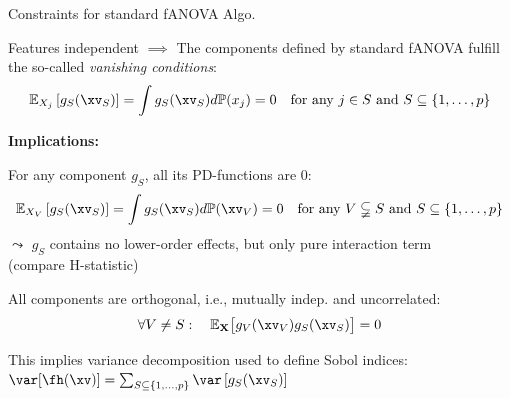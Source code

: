 \documentclass[10pt,compress,t,notes=noshow, xcolor=table]{beamer}
\newcommand{\Xv}{\mathbf{X}} %
\begin{document}
\begin{framev}[align=top]{Constraints for standard fANOVA Algo.}
\begin{theorem}
Features independent $\implies$ The components defined by standard fANOVA fulfill the so-called \textit{vanishing conditions}:
\begin{align*}
\mathbb{E}_{X_j}\left[ g_{S}(\xv_S) \right]
= \int g_{S}(\xv_S) d \mathbb{P}(x_j) = 0 \quad \text{for any } j \in S \text{ and } S \subseteq \{1, \ldots, p\}
\end{align*}
\end{theorem}
\pause
\textbf{Implications:}
\begin{itemizeM}
\item For any component $g_{S}$, all its PD-functions are 0:
$$
\mathbb{E}_{X_V}\left[ g_{S}(\xv_S) \right]
= \int g_{S}(\xv_S) d \mathbb{P}(\xv_V) = 0 \quad \text{for any } V \subsetneqq S \text{ and } S \subseteq \{1, \ldots, p\}
$$
$\leadsto$ $g_{S}$ contains no lower-order effects, but only pure interaction term \\
(compare H-statistic)
\pause
\item All components are orthogonal, i.e., mutually indep. and uncorrelated:
$$
\forall V \neq S: \quad \mathbb{E}_{\Xv} \bigl[ g_{V}(\xv_V) g_{S}(\xv_S) \bigr] = 0
$$
\item This implies variance decomposition used to define Sobol indices:
$ \var[ \fh(\xv) ] = \textstyle\sum_{S \subseteq \{1,\ldots,p\}} \var \left[ g_{S}(\xv_S) \right]$
\end{itemizeM}
\end{framev}
\end{document}
